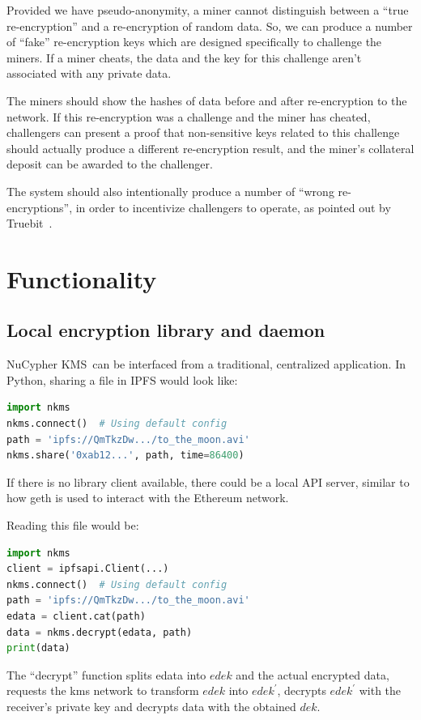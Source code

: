 \documentclass[longbibliography]{revtex4-1}
\newcommand{\kms}{NuCypher KMS}
\begin{document}
Provided we have pseudo-anonymity, a miner cannot distinguish between a ``true re-encryption'' and a re-encryption of random data.
So, we can produce a number of ``fake'' re-encryption keys which are designed specifically to challenge the miners.
If a miner cheats, the data and the key for this challenge aren't associated with any private data.

The miners should show the hashes of data before and after re-encryption to the network.
If this re-encryption was a challenge and the miner has cheated, challengers can present a proof that non-sensitive keys related to this challenge should actually
produce a different re-encryption result, and the miner's collateral deposit can be awarded to the challenger.

The system should also intentionally produce a number of ``wrong re-encryptions'', in order to incentivize challengers to operate, as pointed out by
Truebit~\cite{truebit}.

\section{Functionality}

\subsection{Local encryption library and daemon}

\kms~can be interfaced from a traditional, centralized application.
In Python, sharing a file in IPFS would look like:
\begin{lstlisting}[frame=single,language=Python]
import nkms
nkms.connect()  # Using default config
path = 'ipfs://QmTkzDw.../to_the_moon.avi'
nkms.share('0xab12...', path, time=86400)
\end{lstlisting}
If there is no library client available, there could be a local API server, similar to how geth is used to interact with the Ethereum network.

Reading this file would be:
\begin{lstlisting}[frame=single,language=Python]
import nkms
client = ipfsapi.Client(...)
nkms.connect()  # Using default config
path = 'ipfs://QmTkzDw.../to_the_moon.avi'
edata = client.cat(path)
data = nkms.decrypt(edata, path)
print(data)
\end{lstlisting}
The ``decrypt'' function splits edata into $edek$ and the actual encrypted data,
requests the kms network to transform $edek$ into $edek^{\prime}$,
decrypts $edek^{\prime}$ with the receiver's private key and
decrypts data with the obtained $dek$.
\end{document}
